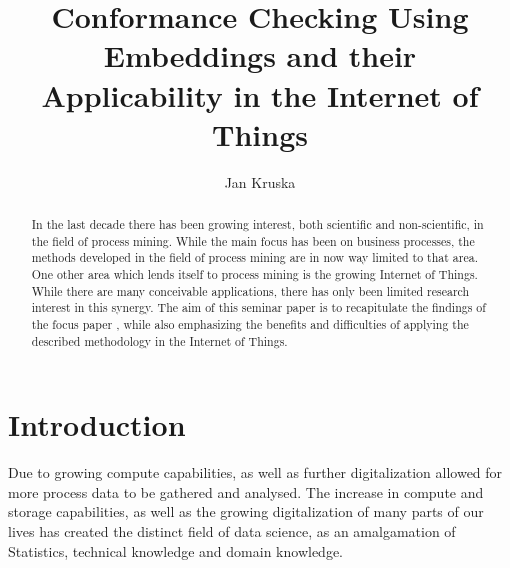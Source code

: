 \documentclass[runningheads]{template/llncs}
\begin{document}
%
\title{Conformance Checking Using Embeddings and their Applicability in the Internet of Things}
%
%
\author{Jan Kruska}
%
%
%
\maketitle              %
%
%
%
%

\begin{abstract}
	In the last decade there has been growing interest, both scientific and non-scientific, in the field of process mining.
	While the main focus has been on business processes, the methods developed in the field of process mining are in now way limited to that area.
	One other area which lends itself to process mining is the growing Internet of Things.
	While there are many conceivable applications,  there has only been limited research interest in this synergy.
	The aim of this seminar paper is to recapitulate the findings of the focus paper \cite{PBWe20}, while also emphasizing the benefits and difficulties of applying the described methodology in the Internet of Things.
\end{abstract}

\section{Introduction}

Due to growing compute capabilities, as well as further digitalization allowed for more process data to be gathered and analysed.
The increase in compute and storage capabilities, as well as the growing digitalization of many parts of our lives has created the distinct field of data science, as an amalgamation of Statistics, technical knowledge and domain knowledge.
\end{document}
